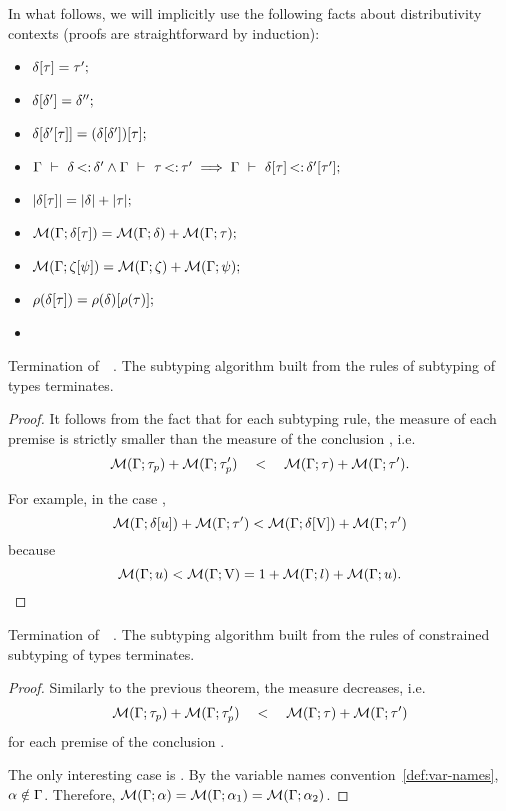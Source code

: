 In what follows, we will implicitly use the following facts about
distributivity contexts (proofs are straightforward by induction):
\begin{itemize}
    \item $\delta[\tau] = \tau';$
    \item $\delta[\delta'] = \delta'';$
    \item $\delta[\delta'[\tau]] = 
        (\delta[\delta'])[\tau];$
    \item $\Gamma\ \vdash\ \delta \operatorname{<:} \delta' \land \Gamma\ \vdash\ \tau \operatorname{<:} \tau'
        \implies \Gamma\ \vdash\ \delta[\tau] \operatorname{<:} \delta'[\tau'];$
    \item $|\delta[\tau]| = |\delta| + |\tau|;$
    \item $\operatorname{\mathcal{M}}(\Gamma;\delta[\tau]) = \operatorname{\mathcal{M}}(\Gamma;\delta) + \operatorname{\mathcal{M}}(\Gamma;\tau);$
    \item $\operatorname{\mathcal{M}}(\Gamma;\zeta[\psi]) = 
        \operatorname{\mathcal{M}}(\Gamma;\zeta) + \operatorname{\mathcal{M}}(\Gamma;\psi);$
    \item $\rho(\delta[\tau]) = 
        \rho(\delta)[\rho(\tau)]; $    
    \item {}
\end{itemize}


\begin{theorem}{Termination of\ \ .}%
\label{thm:subty-terminates}
    The subtyping algorithm built from the rules of subtyping of types
     terminates.
\end{theorem}
\begin{proof}
    It follows from the fact that for each subtyping rule, 
    the measure of each premise 
    is strictly smaller than the measure 
    of the conclusion , i.e.
    \[\operatorname{\mathcal{M}}(\Gamma;\tau_p) + \operatorname{\mathcal{M}}(\Gamma;\tau'_p) \quad<\quad 
    \operatorname{\mathcal{M}}(\Gamma;\tau) + \operatorname{\mathcal{M}}(\Gamma;\tau').\]

    For example, in the case ,
    \[\operatorname{\mathcal{M}}(\Gamma;\delta[u]) + \operatorname{\mathcal{M}}(\Gamma;\tau') < 
    \operatorname{\mathcal{M}}(\Gamma;\delta[\mathrm{V}]) + \operatorname{\mathcal{M}}(\Gamma;\tau')\]
    because \[\operatorname{\mathcal{M}}(\Gamma;u) < \operatorname{\mathcal{M}}(\Gamma;\mathrm{V}) = 
        1 + \operatorname{\mathcal{M}}(\Gamma;l) + \operatorname{\mathcal{M}}(\Gamma;u).\]
\end{proof}

\begin{theorem}{Termination of\ \ .}%
\label{thm:subtyctr-terminates}
    The subtyping algorithm built from the rules of
    constrained subtyping of types
     terminates.
\end{theorem}
\begin{proof}
    Similarly to the previous theorem, the measure decreases, i.e.
    \[\operatorname{\mathcal{M}}(\Gamma;\tau_p) + \operatorname{\mathcal{M}}(\Gamma;\tau'_p) \quad<\quad 
    \operatorname{\mathcal{M}}(\Gamma;\tau) + \operatorname{\mathcal{M}}(\Gamma;\tau')\]
    for each premise 
    of the conclusion .
    
    The only interesting case is .
    By the variable names convention~\ref{def:var-names}, $\alpha \notin \Gamma$.
    Therefore, $\operatorname{\mathcal{M}}(\Gamma;\alpha) = \operatorname{\mathcal{M}}(\Gamma;\alpha_1) = \operatorname{\mathcal{M}}(\Gamma;\alpha_2)$.
\end{proof}

